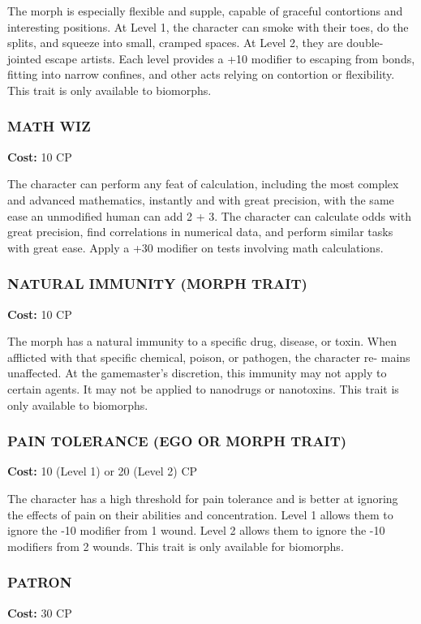 The morph is especially flexible and supple, capable of graceful contortions
and interesting positions. At Level 1, the character can smoke with their toes,
do the splits, and squeeze into small, cramped spaces. At Level 2, they are
double-jointed escape artists. Each level provides a +10 modifier to escaping
from bonds, fitting into narrow confines, and other acts relying on contortion
or flexibility. This trait is only available to biomorphs.

\subsubsection{MATH WIZ}
\textbf{Cost:} 10 CP

The character can perform any feat of calculation, including the most complex
and advanced mathematics, instantly and with great precision, with the same
ease an unmodified human can add 2 + 3. The character can calculate odds with
great precision, find correlations in numerical data, and perform similar tasks
with great ease. Apply a +30 modifier on tests involving math calculations.

\subsubsection{NATURAL IMMUNITY (MORPH TRAIT)}
\textbf{Cost:} 10 CP

The morph has a natural immunity to a specific drug, disease, or toxin. When
afflicted with that specific chemical, poison, or pathogen, the character re-
mains unaffected. At the gamemaster’s discretion, this immunity may not apply
to certain agents. It may not be applied to nanodrugs or nanotoxins. This trait
is only available to biomorphs.

\subsubsection{PAIN TOLERANCE (EGO OR MORPH TRAIT)}
\textbf{Cost:} 10 (Level 1) or 20 (Level 2) CP

The character has a high threshold for pain tolerance and is better at
ignoring the effects of pain on their abilities and concentration. Level 1
allows them to ignore the -10 modifier from 1 wound. Level 2 allows them to
ignore the -10 modifiers from 2 wounds. This trait is only available for
biomorphs.

\subsubsection{PATRON}
\textbf{Cost:} 30 CP

